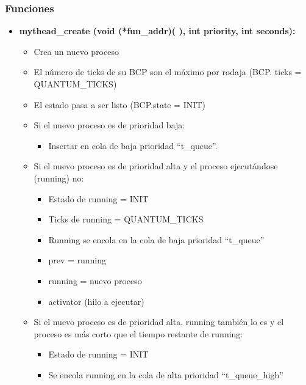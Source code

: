 \documentclass[10pt, spanish, pdftex]{template/UC3M_document}
\begin{document}
\subsubsection{Funciones}
\begin{itemize}
    \item \textbf{mythead\_create (void (*fun\_addr)( ), int priority, int seconds):}
    \vspace{-2mm}
    \begin{itemize}
     \setlength{\itemsep}{-1.5mm}
        \item Crea un nuevo proceso 
        \item El número de ticks de su BCP son el máximo por rodaja (BCP. ticks = QUANTUM\_TICKS)
        \item El estado pasa a ser listo (BCP.state = INIT)
        \item Si el nuevo proceso es de prioridad baja:
        \vspace{-2mm}
    \begin{itemize}
     \setlength{\itemsep}{-1.5mm}
            \item Insertar en cola de baja prioridad “t\_queue”.
        \end{itemize}
        \item Si el nuevo proceso es de prioridad alta y el proceso ejecutándose (running) no:
        \vspace{-2mm}
    \begin{itemize}
     \setlength{\itemsep}{-1.5mm}
            \item Estado de running = INIT
            \item Ticks de running = QUANTUM\_TICKS
            \item Running se encola en la cola de baja prioridad “t\_queue”
            \item prev = running
            \item running = nuevo proceso
            \item activator (hilo a ejecutar)
        \end{itemize}
        \item Si el nuevo proceso es de prioridad alta, running también lo es y el proceso es más corto que el tiempo restante de running:
        \vspace{-2mm}
    \begin{itemize}
     \setlength{\itemsep}{-1.5mm}
            \item Estado de running = INIT
            \item Se encola running en la cola de alta prioridad “t\_queue\_high”

\end{itemize}
\end{itemize}
\end{itemize}
\end{document}
